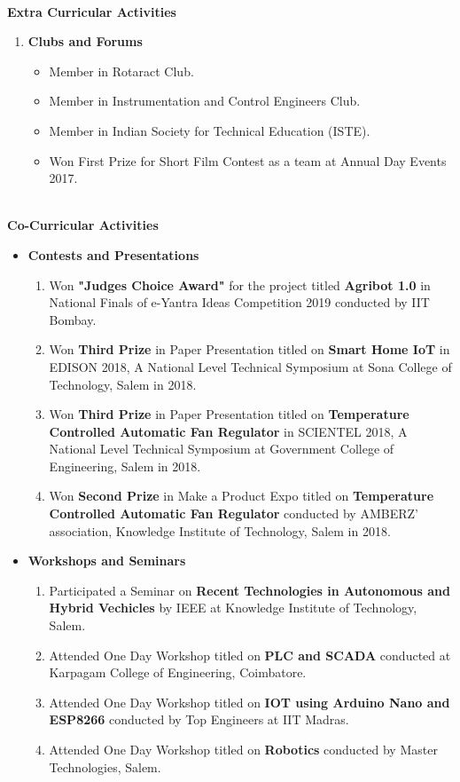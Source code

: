 \documentclass{article}
\begin{document}
\Large \textbf{\\Extra Curricular Activities}\
\begin{enumerate}	\item \textbf{Clubs and Forums}
	\begin{itemize}
		\item Member in Rotaract Club.
		\item Member in Instrumentation and Control Engineers Club.
		\item Member in Indian Society for Technical Education (ISTE).
		\item Won First Prize for Short Film Contest as a team at Annual Day Events 2017.
	\end{itemize}
\end{enumerate}

\Large \textbf{\\Co-Curricular Activities}\
\begin{itemize}
	\item \textbf{Contests and Presentations}
	\begin{enumerate}
		\item Won \textbf{"Judges Choice Award"} for the project titled \textbf{Agribot 1.0} in National Finals of e-Yantra Ideas Competition 2019 conducted by IIT Bombay.  
		\item Won \textbf{Third Prize} in Paper Presentation titled on \textbf{Smart Home IoT} in EDISON 2018, A National Level Technical Symposium at Sona College of Technology, Salem in 2018.
		\item Won \textbf{Third Prize} in Paper Presentation titled on \textbf{Temperature Controlled Automatic Fan Regulator} in SCIENTEL 2018, A National Level Technical Symposium at Government College of Engineering, Salem in 2018.
		\item Won \textbf{Second Prize} in Make a Product Expo titled on \textbf{Temperature Controlled Automatic Fan Regulator} conducted by AMBERZ’ association, Knowledge Institute of Technology, Salem in 2018.
		
	\end{enumerate}

 \item \textbf{Workshops and Seminars}
\begin{enumerate}
	\item Participated a Seminar on \textbf{Recent Technologies in Autonomous and Hybrid Vechicles} by IEEE at Knowledge Institute of Technology, Salem.
	\item Attended One Day Workshop titled on \textbf{PLC and SCADA} conducted at Karpagam College of Engineering, Coimbatore.
	\item Attended One Day Workshop titled on \textbf{IOT using Arduino Nano and ESP8266} conducted by Top Engineers at IIT Madras.
	\item Attended One Day Workshop titled on \textbf{Robotics} conducted by Master Technologies, Salem.
\end{enumerate}
\end{itemize}
\end{document}
